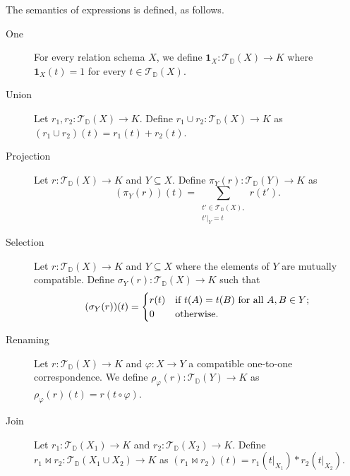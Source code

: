The semantics of \ARA expressions is defined, as follows.

\begin{description}


\item[One] For every relation schema $X$,
  we define $\mathbf{1}_X: \mathcal{T}_{\mathbb{D}}(X) \to K$ where $\mathbf{1}_X(t) = 1$ for every $t \in \mathcal{T}_{\mathbb{D}}(X)$. 


\item[Union] Let $r_1, r_2: \mathcal{T}_{\mathbb{D}}(X) \to K$. Define $r_1 \cup r_2: \mathcal{T}_{\mathbb{D}}(X) \to K$ as $(r_1 \cup r_2)(t) = r_1(t) + r_2(t)$.


\item[Projection] Let $r: \mathcal{T}_{\mathbb{D}}(X) \to K$ and $Y \subseteq X$. Define $\pi_{Y}(r): \mathcal{T}_{\mathbb{D}}(Y) \to K$ as
\[
(\pi_{Y}(r))(t) = \sum_{\substack{t' \in \mathcal{T}_{\mathbb{D}}(X),\\ t'|_{Y} = t}} \!\! r(t').
\]


\item[Selection] Let $r: \mathcal{T}_{\mathbb{D}}(X) \to K$ and $Y \subseteq X$ where the elements of $Y$ are mutually compatible. Define $\sigma_{Y}(r): \mathcal{T}_{\mathbb{D}}(X) \to K$ such that
\[
(\sigma_{Y}(r))(t) =
\begin{cases}
r(t) & \text{if } t(A)=t(B) \text{ for all } A, B \in Y;\cr
0    & \text{otherwise}.
\end{cases}
\]


\item[Renaming] Let $r: \mathcal{T}_{\mathbb{D}}(X) \to K$ and $\varphi: X \to Y$ a compatible one-to-one correspondence. We define $\rho_\varphi(r): \mathcal{T}_{\mathbb{D}}(Y) \to K$ as $\rho_\varphi(r)(t) = r(t \circ \varphi)$.

\item[Join] Let $r_1: \mathcal{T}_{\mathbb{D}}(X_1) \to K$ and $r_2: \mathcal{T}_{\mathbb{D}}(X_2) \to K$. Define $r_1 \Join r_2: \mathcal{T}_{\mathbb{D}}(X_1 \cup X_2) \to K$ as $(r_1 \Join r_2)(t) = r_1(t|_{X_1})*r_2(t|_{X_2})$.
\end{description}

